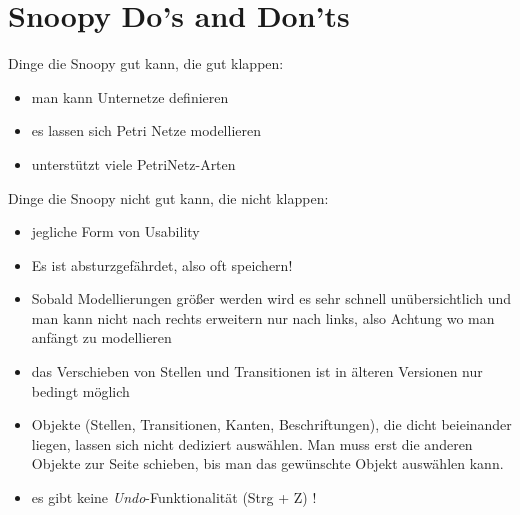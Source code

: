 \section{Snoopy Do's and Don'ts}
Dinge die Snoopy gut kann, die gut klappen:

 \begin{itemize}
	\item man kann Unternetze definieren
	\item es lassen sich Petri Netze modellieren
	\item unterstützt viele PetriNetz-Arten
\end{itemize}

Dinge die Snoopy nicht gut kann, die nicht klappen:
 \begin{itemize}
	\item jegliche Form von Usability
	\item Es ist absturzgefährdet, also oft speichern!
	\item Sobald Modellierungen größer werden wird es sehr schnell unübersichtlich und man kann nicht nach rechts erweitern nur nach links, also Achtung wo man anfängt zu modellieren
	\item das Verschieben von Stellen und Transitionen ist in älteren Versionen nur bedingt möglich
	\item Objekte (Stellen, Transitionen, Kanten, Beschriftungen), die dicht beieinander liegen, lassen sich nicht dediziert auswählen. Man muss erst die anderen Objekte zur Seite schieben, bis man das gewünschte Objekt auswählen kann.
	\item es gibt keine \textit{Undo}-Funktionalität (Strg + Z) !
\end{itemize}